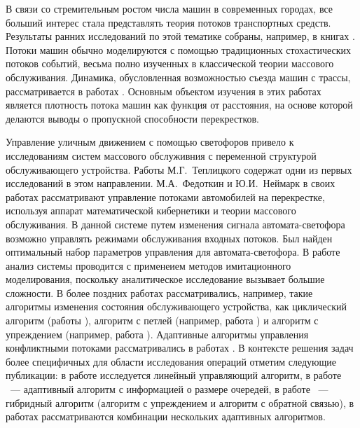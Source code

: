 В связи со стремительным ростом числа машин в современных городах, все больший интерес стала представлять теория потоков транспортных средств. Результаты ранних исследований по этой тематике собраны, например, в книгах \cite{Haight:1963, Drew:1968,Inose}. Потоки машин обычно моделируются с помощью традиционных стохастических потоков событий, весьма полно изученных в классической теории массового обслуживания.  Динамика, обусловленная возможностью съезда машин с трассы, рассматривается в работах \cite{AfanasyevaBulinskaya:2013:1,AfanasyevaBulinskaya:2010,AfanasyevaBulinskaya:2013:2}. Основным объектом изучения в этих работах является плотность потока машин как функция от расстояния, на основе которой делаются выводы о пропускной способности перекрестков.

Управление уличным движением с помощью светофоров привело к исследованиям систем массового обслуживния с переменной структурой обслуживающего устройства. Работы М.Г.~Теплицкого \cite{Teplicki:1968, Teplicki:1969} содержат одни из первых исследований в этом направлении. М.А.~Федоткин и Ю.И.~Неймарк в своих работах \cite{Neimark:1966, Fedotkin:1969}  рассматривают управление потоками автомобилей на перекрестке, используя аппарат математической кибернетики и теории массового обслуживания. В данной системе путем изменения сигнала автомата-светофора возможно управлять режимами обслуживания входных потоков. Был найден оптимальный набор параметров управления для автомата-светофора. В работе~\cite{Neimark:1985} анализ системы проводится с применеием методов имитационного моделирования, поскольку аналитическое исследование вызывает большие сложности. В более поздних работах рассматривались, например, такие алгоритмы изменения состояния обслуживающего устройства, как циклический алгоритм (работы \cite{Proidakova:2008, Fedotkin:2014, Zorin:2014, DCCN2016:NAZAROV}), алгоритм с петлей (например, работа \cite{Zorin:2017}) и алгоритм с упреждением (например, работа \cite{Kuvykina:1990}). Адаптивные алгоритмы управления конфликтными потоками рассматривались в работах \cite{Kudelin:1996, Litvak:2000}. В контексте решения задач более специфичных для области исследования операций отметим следующие публикации: в работе \cite{Dunne:1964} исследуется линейный управляющий алгоритм, в работе \cite{Gordon:1969}~--- адаптивный алгоритм с информацией о размере очередей, в работе \cite{Day2012}~--- гибридный алгоритм (алгоритм с упреждением и алгоритм с обратной связью), в работах \cite{Vasilakos:1990,Cotton:1995,Mason:1999,Kokkonis:2016} рассматриваются комбинации нескольких адаптивных алгоритмов.

